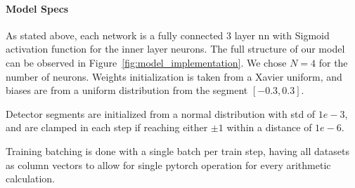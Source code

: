 \documentclass[paper/ddppaper2.tex]{subfiles}
\begin{document}
\paragraph{Model Specs}

As stated above, each network is a fully connected 3 layer \gls{nn} with Sigmoid activation function for the inner layer neurons. The full structure of our model can be observed in Figure~\ref{fig:model_implementation}. We chose $N=4$ for the number of neurons. Weights initialization is taken from a Xavier uniform, and biases are from a uniform distribution from the segment $[-0.3, 0.3]$.

Detector segments are initialized from a normal distribution with std of $1e-3$, and are clamped in each step if reaching either $\pm 1$ within a distance of $1e-6$.

Training batching is done with a single batch per train step, having all datasets as column vectors to allow for single pytorch operation for every arithmetic calculation.
\end{document}
